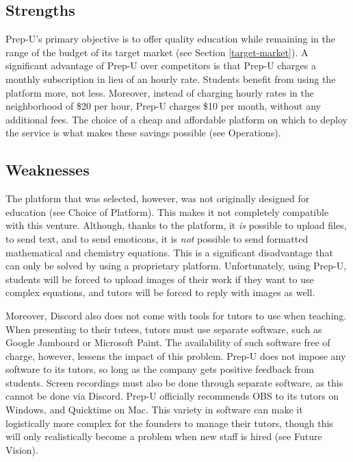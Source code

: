 \documentclass{business}
\begin{document}
    \subsection{Strengths}
    Prep-U's primary objective is to offer quality education while remaining in the range of the budget of its target market (see Section \ref{target-market}). A significant advantage of Prep-U over competitors is that Prep-U charges a monthly subscription in lieu of an hourly rate. Students benefit from using the platform more, not less. Moreover, instead of charging hourly rates in the neighborhood of \$20 per hour, Prep-U charges \$10 per month, without any additional fees. The choice of a cheap and affordable platform on which to deploy the service is what makes these savings possible (see Operations).
    \subsection{Weaknesses}
    The platform that was selected, however, was not originally designed for education (see Choice of Platform). This makes it not completely compatible with this venture. Although, thanks to the platform, it \emph{is} possible to upload files, to send text, and to send emoticons, it is \emph{not} possible to send formatted mathematical and chemistry equations. This is a significant disadvantage that can only be solved by using a proprietary platform. Unfortunately, using Prep-U, students will be forced to upload images of their work if they want to use complex equations, and tutors will be forced to reply with images as well.\par
    Moreover, Discord also does not come with tools for tutors to use when teaching. When presenting to their tutees, tutors must use separate software, such as Google Jamboard or Microsoft Paint. The availability of such software free of charge, however, lessens the impact of this problem. Prep-U does not impose any software to its tutors, so long as the company gets positive feedback from students. Screen recordings must also be done through separate software, as this cannot be done via Discord. Prep-U officially recommends OBS to its tutors on Windows, and Quicktime on Mac. This variety in software can make it logistically more complex for the founders to manage their tutors, though this will only realistically become a problem when new staff is hired (see Future Vision).
\end{document}
